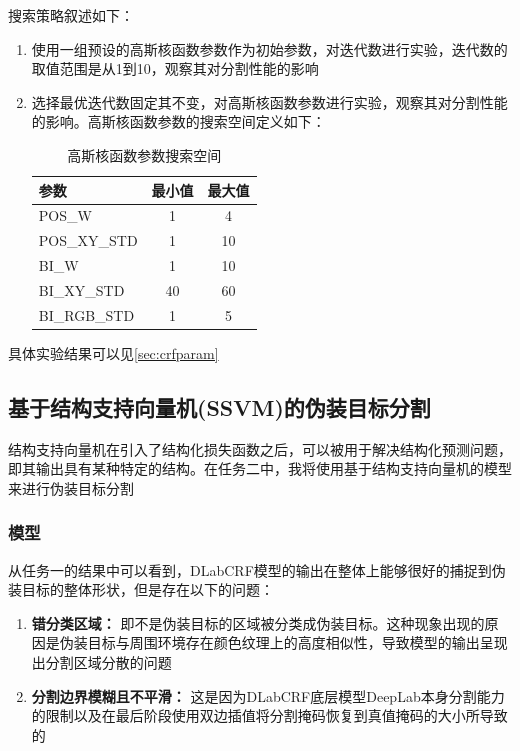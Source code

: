 \documentclass[a4paper,12pt]{ctexart}
\begin{document}
搜索策略叙述如下：
\begin{enumerate}
    \item 使用一组预设的高斯核函数参数作为初始参数，对迭代数进行实验，迭代数的取值范围是从1到10，观察其对分割性能的影响
    \item 选择最优迭代数固定其不变，对高斯核函数参数进行实验，观察其对分割性能的影响。高斯核函数参数的搜索空间定义如下：
    \begin{table}[H]
    \centering
    \begin{tabular}{@{}lcc@{}}
    \toprule
    \textbf{参数} & \textbf{最小值} & \textbf{最大值} \\ \midrule
    POS\_W            & 1                  & 4                 \\
    POS\_XY\_STD       & 1                  & 10                 \\
    BI\_W             & 1                  & 10                 \\
    BI\_XY\_STD        & 40                 & 60                \\
    BI\_RGB\_STD       & 1                  & 5                 \\ \bottomrule
    \end{tabular}
    \caption{高斯核函数参数搜索空间}
    \end{table}

\end{enumerate}

具体实验结果可以见\ref{sec:crfparam}


\subsection{基于结构支持向量机(SSVM)的伪装目标分割}
结构支持向量机在引入了结构化损失函数之后，可以被用于解决结构化预测问题，即其输出具有某种特定的结构。在任务二中，我将使用基于结构支持向量机的模型来进行伪装目标分割

\subsubsection{模型}
从任务一的结果中可以看到，DLabCRF模型的输出在整体上能够很好的捕捉到伪装目标的整体形状，但是存在以下的问题：
\begin{enumerate}
    \item \textbf{错分类区域：} 即不是伪装目标的区域被分类成伪装目标。这种现象出现的原因是伪装目标与周围环境存在颜色纹理上的高度相似性，导致模型的输出呈现出分割区域分散的问题
    \item \textbf{分割边界模糊且不平滑：} 这是因为DLabCRF底层模型DeepLab本身分割能力的限制以及在最后阶段使用双边插值将分割掩码恢复到真值掩码的大小所导致的
\end{enumerate}
\end{document}

